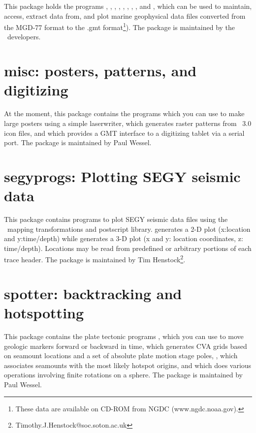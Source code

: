 This package holds the programs , ,
, , , ,
, , and , which can be
used to maintain, access, extract data from, and plot marine geophysical
data files converted from the MGD-77 format to the .gmt format\footnote{These data are available on CD-ROM from NGDC
(www.ngdc.noaa.gov).}). The package is maintained by the \GMT\ developers.

\section{misc: posters, patterns, and digitizing}

At the moment, this package contains the programs 
which you can use to make large posters using a simple laserwriter,
 which generates raster patterns from \GMT\ 3.0
icon files, and  which provides a GMT interface
to a digitizing tablet via a serial port.  The package is maintained by Paul Wessel.

\section{segyprogs: Plotting SEGY seismic data}

This package contains programs to plot SEGY seismic data files using
the \GMT\ mapping transformations and postscript library.  generates
a 2-D plot (x:location and y:time/depth) while  generates a
3-D plot (x and y: location coordinates, z: time/depth). Locations may be
read from predefined or arbitrary portions of each trace header.
The package is maintained by Tim Henstock\footnote{Timothy.J.Henstock@soc.soton.ac.uk}.

\section{spotter: backtracking and hotspotting}

This package contains the plate tectonic programs ,
which you can use to move geologic markers forward or backward in time, 
 which generates CVA grids based on seamount locations
and a set of absolute plate motion stage poles, ,
which associates seamounts with the most likely hotspot origins, and 
which does various operations involving finite rotations on a sphere.  The package
is maintained by Paul Wessel.

